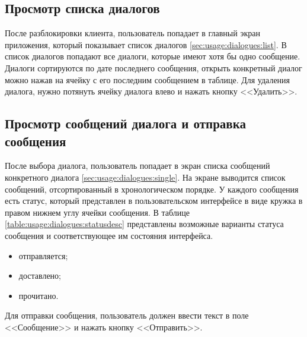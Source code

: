 \subsection{Просмотр списка диалогов}
\label{sec:usage:dialogues}

После разблокировки клиента, пользователь попадает в главный экран приложения, который показывает список диалогов \ref{sec:usage:dialogues:list}. В список диалогов попадают все диалоги, которые имеют хотя бы одно сообщение. Диалоги сортируются по дате последнего сообщения, открыть конкретный диалог можно нажав на ячейку с его последним сообщением в таблице. Для удаления диалога, нужно потянуть ячейку диалога влево и нажать кнопку <<Удалить>>.

\subsection{Просмотр сообщений диалога и отправка сообщения}
\label{sec:usage:dialogue}

После выбора диалога, пользователь попадает в экран списка сообщений конкретного диалога \ref{sec:usage:dialogues:single}. На экране выводится список сообщений, отсортированный в хронологическом порядке. У каждого сообщения есть статус, который представлен в пользовательском интерфейсе в виде кружка в правом нижнем углу ячейки сообщения. В таблице \ref{table:usage:dialogues:statusdesc} представлены возможные варианты статуса сообщения и соответствующее им состояния интерфейса.

\begin{itemize}
	\item отправляется;
	\item доставлено;
	\item прочитано.
\end{itemize}

Для отправки сообщения, пользователь должен ввести текст в поле <<Сообщение>> и нажать кнопку <<Отправить>>.

